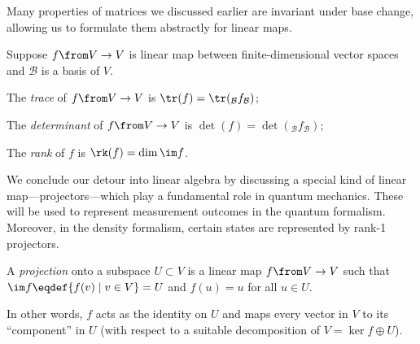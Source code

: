 \documentclass[a4paper,oneside, 12pt]{amsart}
\begin{document}
Many properties of matrices we discussed earlier are invariant under base change, allowing us to formulate them abstractly for linear maps.
\begin{definition}\label{def:trace-of-an-endomorphism}
  Suppose \(f\from V \to V\) is linear map between finite-dimensional vector spaces and \(\mathcal{B}\) is a basis of \(V\).
  \begin{thmlist}
    \item The \emph{trace} of \(f\from V \to V\) is \(\tr(f) = \tr(_{\mathcal{B}}f_{\mathcal{B}})\);
    \item The \emph{determinant} of \(f \from V\to V\) is \(\det(f) = \det(_{\mathcal{B}}f_{\mathcal{B}})\);
    \item The \emph{rank} of \(f\) is \(\rk(f) = \dim \im f\).
  \end{thmlist}
\end{definition}

We conclude our detour into linear algebra by discussing a special kind of linear map---projectors---which play a fundamental role in quantum mechanics.
These will be used to represent measurement outcomes in the quantum formalism. Moreover, in the density formalism, certain states are represented by rank-1 projectors.

\begin{definition}\label{def:projection}
  A \emph{projection} onto a subspace \(U \subset V\) is a linear map \(f\from V \to V\) such that \(\im f \eqdef\{ f(v) \mid v \in V\} = U\) and \(f(u) = u \) for all \(u \in U\).
\end{definition}

In other words, \( f \) acts as the identity on \( U \) and maps every vector in \( V \) to its ``component'' in \( U \) (with respect to a suitable decomposition of \( V= \ker f \oplus U \)).
\end{document}

